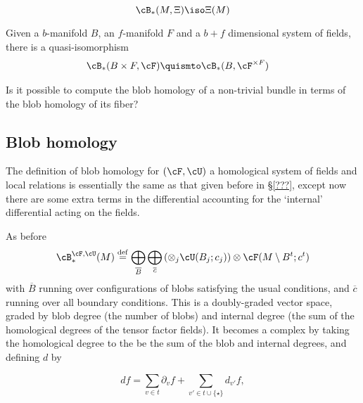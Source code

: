 \begin{thm}
\begin{equation*}
\cB_*(M, \Xi) \iso \Xi(M)
\end{equation*}
\end{thm}

\begin{thm}
Given a $b$-manifold $B$, an $f$-manifold $F$ and a $b+f$ dimensional system of fields,
there is a quasi-isomorphism
\begin{align*}
\cB_*(B \times F, \cF) & \quismto \cB_*(B, \cF^{\times F})
\end{align*}
\end{thm}

\begin{question}
Is it possible to compute the blob homology of a non-trivial bundle in terms of the blob homology of its fiber?
\end{question}

\subsection{Blob homology}
The definition of blob homology for $(\cF, \cU)$ a homological system of fields and local relations is essentially the same as that given before in \S \ref{???}, except now there are some extra terms in the differential accounting for the `internal' differential acting on the fields.

As before
\begin{equation*}
	\cB_*^{\cF,\cU}(M) \deq \bigoplus_{\overline{B}} \bigoplus_{\overline{c}}
		\left( \otimes_j \cU(B_j; c_j)\right) \otimes \cF(M \setmin B^t; c^t)
\end{equation*}
with $\overline{B}$ running over configurations of blobs satisfying the usual conditions, and $\overline{c}$ running over all boundary conditions. This is a doubly-graded vector space, graded by blob degree (the number of blobs) and internal degree (the sum of the homological degrees of the tensor factor fields). It becomes a complex by taking the homological degree to the be the sum of the blob and internal degrees, and defining $d$ by

\begin{equation*}
d f = \sum_{v \in t} \partial_v f + \sum_{v' \in t \cup \{\star\}} d_{v'} f,
\end{equation*}



